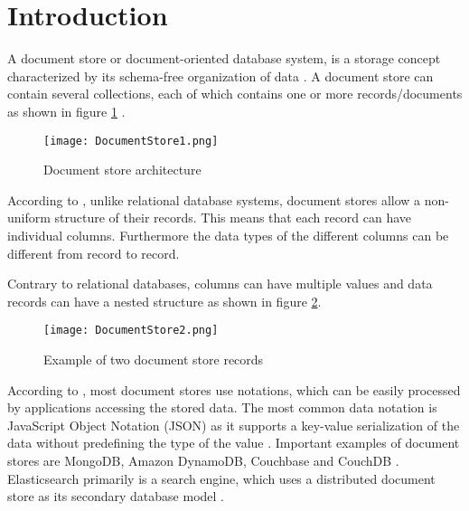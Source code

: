 
\chapter*{Introduction}

A document store or document-oriented database system, is a storage concept characterized by its schema-free organization of data \autocite{solidit2019}. 
A document store can contain several collections, each of which contains one or more records/documents as shown in figure \ref{fig:docstore1} \autocite{mongodb2019}.

\begin{figure}[ht]
    \centering
    \texttt{[image: DocumentStore1.png]}
    \caption{Document store architecture}
    \label{fig:docstore1}
\end{figure}

According to \autocite{solidit2019}, unlike relational database systems, document stores allow a non-uniform structure of their records. This means that each record can have individual columns. Furthermore the data types of the different columns can be different from record to record. 

Contrary to relational databases, columns can have multiple values and data records can have a nested structure as shown in figure \ref{fig:docstore2}.

\begin{figure}[ht]
    \centering
    \texttt{[image: DocumentStore2.png]}
    \caption{Example of two document store records \autocite{buckenhofera.2019}}
    \label{fig:docstore2}
\end{figure}

According to \autocite{solidit2019}, most document stores use notations, which can be easily processed by applications accessing the stored data. The most common data notation is JavaScript Object Notation (JSON) as it supports a key-value serialization of the data without predefining the type of the value \autocite{elastic2019}.
Important examples of document stores are MongoDB, Amazon DynamoDB, Couchbase and CouchDB \autocite{solidit2019}. Elasticsearch primarily is a search engine, which uses a distributed document store as its secondary database model \autocite{solidit2019_02}.
